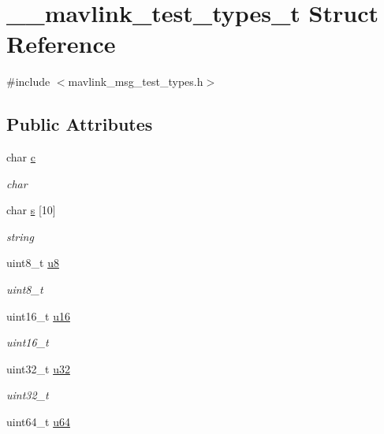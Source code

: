 \hypertarget{struct____mavlink__test__types__t}{}\section{\+\_\+\+\_\+mavlink\+\_\+test\+\_\+types\+\_\+t Struct Reference}
\label{struct____mavlink__test__types__t}


{\ttfamily \#include $<$mavlink\+\_\+msg\+\_\+test\+\_\+types.\+h$>$}

\subsection*{Public Attributes}
\begin{DoxyCompactItemize}
\item 
char \mbox{\hyperlink{struct____mavlink__test__types__t_aa40c20757144c710972466c624337241}{c}}
\begin{DoxyCompactList}\small\item\em char \end{DoxyCompactList}\item 
char \mbox{\hyperlink{struct____mavlink__test__types__t_a63cca099dd61babd27e117c10b94c614}{s}} \mbox{[}10\mbox{]}
\begin{DoxyCompactList}\small\item\em string \end{DoxyCompactList}\item 
uint8\+\_\+t \mbox{\hyperlink{struct____mavlink__test__types__t_a2e20758d4738b63791dbb565f4134a59}{u8}}
\begin{DoxyCompactList}\small\item\em uint8\+\_\+t \end{DoxyCompactList}\item 
uint16\+\_\+t \mbox{\hyperlink{struct____mavlink__test__types__t_ab2db1b1b641ed71c6ee0e351f8ac40d4}{u16}}
\begin{DoxyCompactList}\small\item\em uint16\+\_\+t \end{DoxyCompactList}\item 
uint32\+\_\+t \mbox{\hyperlink{struct____mavlink__test__types__t_ad7afc9ca3801a1f7c8af018609bbf284}{u32}}
\begin{DoxyCompactList}\small\item\em uint32\+\_\+t \end{DoxyCompactList}\item 
uint64\+\_\+t \mbox{\hyperlink{struct____mavlink__test__types__t_a66346b4584997db41725685b6fd38c77}{u64}}

\end{DoxyCompactItemize}

